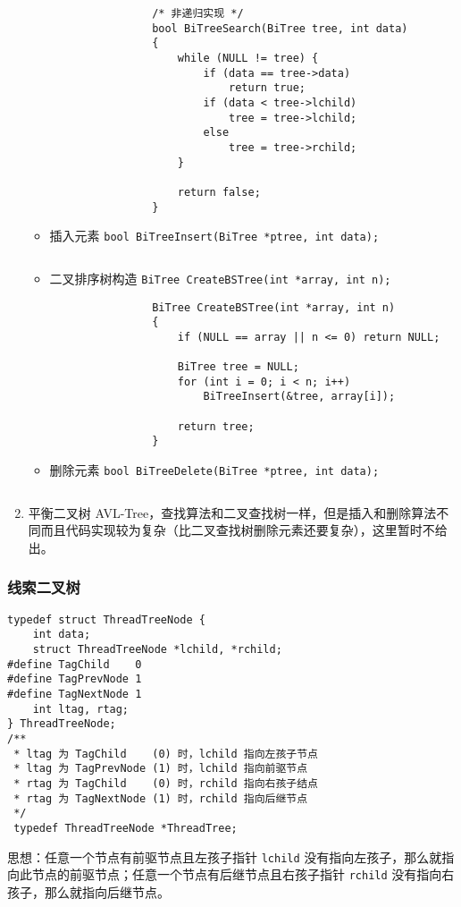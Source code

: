\documentclass{ctexart}
\begin{document}
\begin{enumerate}
\begin{itemize}
\begin{verbatim}
                /* 非递归实现 */
                bool BiTreeSearch(BiTree tree, int data)
                {
                    while (NULL != tree) {
                        if (data == tree->data)
                            return true;
                        if (data < tree->lchild)
                            tree = tree->lchild;
                        else
                            tree = tree->rchild;
                    }

                    return false;
                }
                \end{verbatim}

            \item 插入元素 \texttt{bool BiTreeInsert(BiTree *ptree, int data);}
                \inputminted{c}{codes/bst-insert.c}

            \item 二叉排序树构造 \texttt{BiTree CreateBSTree(int *array, int n);}
                \begin{verbatim}
                BiTree CreateBSTree(int *array, int n)
                {
                    if (NULL == array || n <= 0) return NULL;

                    BiTree tree = NULL;
                    for (int i = 0; i < n; i++)
                        BiTreeInsert(&tree, array[i]);

                    return tree;
                }
                \end{verbatim}

            \item 删除元素 \texttt{bool BiTreeDelete(BiTree *ptree, int data);}
                \inputminted{c}{codes/bst-delete.c}

        \end{itemize}

    \item 平衡二叉树 AVL-Tree，查找算法和二叉查找树一样，但是插入和删除算法不同而且代码实现较为复杂（比二叉查找树删除元素还要复杂），这里暂时不给出。
\end{enumerate}

\subsubsection{线索二叉树}
\begin{verbatim}
typedef struct ThreadTreeNode {
    int data;
    struct ThreadTreeNode *lchild, *rchild;
#define TagChild    0
#define TagPrevNode 1
#define TagNextNode 1
    int ltag, rtag;
} ThreadTreeNode;
/**
 * ltag 为 TagChild    (0) 时，lchild 指向左孩子节点
 * ltag 为 TagPrevNode (1) 时，lchild 指向前驱节点
 * rtag 为 TagChild    (0) 时，rchild 指向右孩子结点
 * rtag 为 TagNextNode (1) 时，rchild 指向后继节点
 */
 typedef ThreadTreeNode *ThreadTree;
\end{verbatim}
思想：任意一个节点有前驱节点且左孩子指针 \texttt{lchild} 没有指向左孩子，那么就指向此节点的前驱节点；任意一个节点有后继节点且右孩子指针 \texttt{rchild} 没有指向右孩子，那么就指向后继节点。
\end{document}
